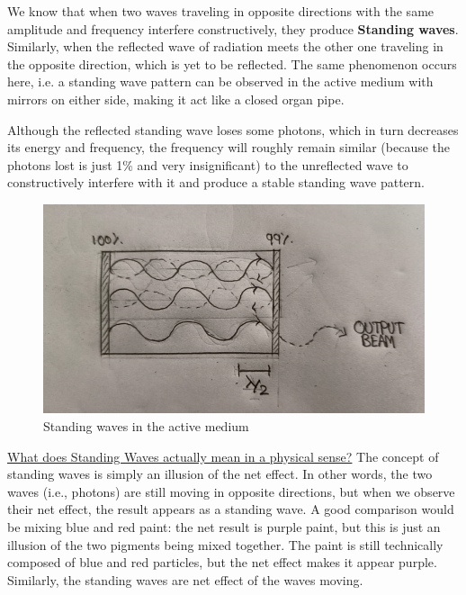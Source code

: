 \documentclass[12pt]{article}
\begin{document}
We know that when two waves traveling in opposite directions with the same amplitude and frequency interfere constructively, they produce \textbf{Standing waves}. Similarly, when the reflected wave of radiation meets the other one traveling in the opposite direction, which is yet to be reflected. The same phenomenon occurs here, i.e. a standing wave pattern can be observed in the active medium with mirrors on either side, making it act like a closed organ pipe. \vspace{.2cm} 

Although the reflected standing wave loses some photons, which in turn decreases its energy and frequency, the frequency will roughly remain similar (because the photons lost is just 1\% and very insignificant) to the unreflected wave to constructively interfere with it and produce a stable standing wave pattern. \vspace{.2cm}

\begin{figure}[H]
    \centering
    \includegraphics[scale=.5]{./img/17_standing_waves.png}
    \caption{Standing waves in the active medium}
\end{figure}

\uline{What does Standing Waves actually mean in a physical sense?} The concept of standing waves is simply an illusion of the net effect. In other words, the two waves (i.e., photons) are still moving in opposite directions, but when we observe their net effect, the result appears as a standing wave. A good comparison would be mixing blue and red paint: the net result is purple paint, but this is just an illusion of the two pigments being mixed together. The paint is still technically composed of blue and red particles, but the net effect makes it appear purple. Similarly, the standing waves are net effect of the waves moving. \vspace{.2cm}
\end{document}
